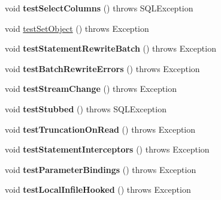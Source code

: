 \begin{DoxyCompactItemize}
void {\bfseries test\+Select\+Columns} ()  throws S\+Q\+L\+Exception 
\item 
void \mbox{\hyperlink{classtestsuite_1_1simple_1_1_statements_test_acf80cede1ff53fcdebca2de611a1c015}{test\+Set\+Object}} ()  throws Exception 
\item 
\mbox{\label{classtestsuite_1_1simple_1_1_statements_test_a30f552176c9ad0cd34ab51a8b90ab0ee}} 
void {\bfseries test\+Statement\+Rewrite\+Batch} ()  throws Exception 
\item 
\mbox{\label{classtestsuite_1_1simple_1_1_statements_test_a104f5db994108a1a798fde9e3f86761f}} 
void {\bfseries test\+Batch\+Rewrite\+Errors} ()  throws Exception 
\item 
\mbox{\label{classtestsuite_1_1simple_1_1_statements_test_a732ef94880943b2889d9880a0e059b95}} 
void {\bfseries test\+Stream\+Change} ()  throws Exception 
\item 
\mbox{\label{classtestsuite_1_1simple_1_1_statements_test_a10f714e4bdd7ad759e21c30eb9506e1c}} 
void {\bfseries test\+Stubbed} ()  throws S\+Q\+L\+Exception 
\item 
\mbox{\label{classtestsuite_1_1simple_1_1_statements_test_ab2e30242ecd0aa65f25500827a73bfbe}} 
void {\bfseries test\+Truncation\+On\+Read} ()  throws Exception 
\item 
\mbox{\label{classtestsuite_1_1simple_1_1_statements_test_a999cf4665befcafe36fc3825964cf28e}} 
void {\bfseries test\+Statement\+Interceptors} ()  throws Exception 
\item 
\mbox{\label{classtestsuite_1_1simple_1_1_statements_test_a3f282768eb4af0908972bed3c8ee8b94}} 
void {\bfseries test\+Parameter\+Bindings} ()  throws Exception 
\item 
\mbox{\label{classtestsuite_1_1simple_1_1_statements_test_a13a9b6c6aa50b52915b0476c28976c10}} 
void {\bfseries test\+Local\+Infile\+Hooked} ()  throws Exception 
\end{DoxyCompactItemize}
